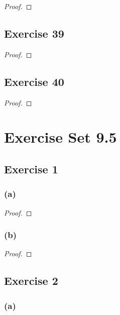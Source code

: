 \documentclass[14pt]{extarticle}
\begin{document}
\begin{proof}

\end{proof}

\subsection{Exercise 39}

\begin{proof}

\end{proof}

\subsection{Exercise 40}

\begin{proof}

\end{proof}

\section{Exercise Set 9.5}

\subsection{Exercise 1}

\subsubsection{(a)}

\begin{proof}

\end{proof}

\subsubsection{(b)}

\begin{proof}

\end{proof}

\subsection{Exercise 2}

\subsubsection{(a)}
\end{document}
